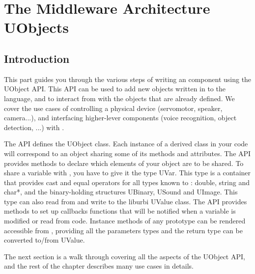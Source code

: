 \part{The Middleware Architecture\\UObjects}
\label{sec:tut:uobject}

\chapter*{Introduction}
This part guides you through the various steps of writing an \urbi
\Cxx component using the UObject API. This API can be used to add new
objects written in \Cxx to the \urbi language, and to interact from
\Cxx with the objects that are already defined. We cover the use cases
of controlling a physical device (servomotor, speaker, camera...), and
interfacing higher-lever components (voice recognition, object
detection, ...) with \urbi.

The API defines the UObject class. Each instance of a derived class in
your \Cxx code will correspond to an \urbi object sharing some of its
methods and attributes. The API provides methods to declare which
elements of your object are to be shared. To share a variable with
\urbi, you have to give it the type UVar. This type is a container that
provides cast and equal operators for all types known to \urbi: double,
string and char*, and the binary-holding structures UBinary, USound
and UImage. This type can also read from and write to the liburbi
UValue class. The API provides methods to set up callbacks functions
that will be notified when a variable is modified or read from \urbi
code. Instance methods of any prototype can be rendered accessible
from \urbi, providing all the parameters types and the return type can
be converted to/from UValue.

The next section is a walk through covering all the aspects of the
UObject API, and the rest of the chapter describes many use cases in
details.





